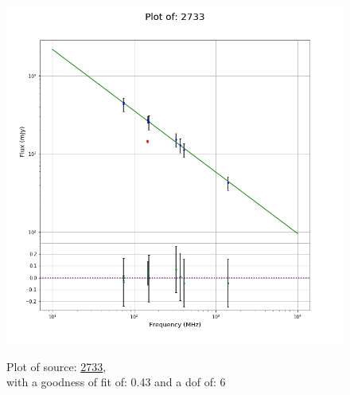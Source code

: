 \documentclass{article}
\begin{document}
\begin{figure}[H]
    \centering
    \begin{minipage}{.5\textwidth}
        \centering
        \includegraphics[scale = 0.35]{KmeulenTrap4P23_1hr/1hr2733.png}
        \captionsetup{labelformat=empty}
        \caption{Plot of source: \href{http://banana.transientskp.org/r4/vlo_KmeulenTrap4P23/runningcatalog/2733}{2733},\\with a goodness of fit of: 0.43 and a dof of: 6}
        \addtocounter{figure}{-1}
        \label{KmeulenTrap4P23:1hr:2733:plot}
    \end{minipage}%
    \begin{minipage}{0.5\textwidth}
        \centering


\end{minipage}
\end{figure}
\end{document}
